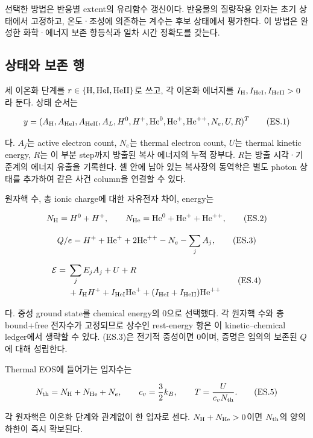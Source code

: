선택한 방법은 반응별 extent의 유리함수 갱신이다. 반응물의 질량작용 인자는 초기 상태에서 고정하고, 온도·조성에 의존하는 계수는 후보 상태에서 평가한다. 이 방법은 완성한 화학·에너지 보존 항등식과 일차 시간 정확도를 갖는다.

\hypertarget{uxc0c1uxd0dcuxc640-uxbcf4uxc874-uxd589}{%
\subsection{상태와 보존 행}\label{uxc0c1uxd0dcuxc640-uxbcf4uxc874-uxd589}}

세 이온화 단계를 \(r\in\{{\rm H},{\rm HeI},{\rm HeII}\}\)로 쓰고, 각 이온화 에너지를 \(I_{\rm H},I_{\rm HeI},I_{\rm HeII}>0\)라 둔다. 상태 순서는

\[
y=(A_{\rm H},A_{\rm HeI},A_{\rm HeII},A_L,
H^0,H^+,{\rm He}^0,{\rm He}^+,{\rm He}^{++},
N_e,U,R)^T
\tag{ES.1}
\]

다. \(A_j\)는 active electron count, \(N_e\)는 thermal electron count, \(U\)는 thermal kinetic energy, \(R\)는 이 부분 step까지 방출된 복사 에너지의 누적 장부다. \(R\)는 방출 시각·기준계의 에너지 유출을 기록한다. 셀 안에 남아 있는 복사장의 동역학은 별도 photon 상태를 추가하여 같은 사건 column을 연결할 수 있다.

원자핵 수, 총 ionic charge에 대한 자유전자 차이, energy는

\[
N_{\rm H}=H^0+H^+,\qquad
N_{\rm He}={\rm He}^0+{\rm He}^++{\rm He}^{++},
\tag{ES.2}
\]

\[
Q/e=H^++{\rm He}^++2{\rm He}^{++}-N_e-\sum_jA_j,
\tag{ES.3}
\]

\[
\begin{aligned}
{\cal E}
={}&\sum_j E_j A_j+U+R\\
 &+I_{\rm H}H^+
 +I_{\rm HeI}{\rm He}^+
 +(I_{\rm HeI}+I_{\rm HeII}){\rm He}^{++}
\end{aligned}
\tag{ES.4}
\]

다. 중성 ground state를 chemical energy의 0으로 선택했다. 각 원자핵 수와 총 bound+free 전자수가 고정되므로 상수인 rest-energy 항은 이 kinetic--chemical ledger에서 생략할 수 있다. (ES.3)은 전기적 중성이면 0이며, 증명은 임의의 보존된 \(Q\)에 대해 성립한다.

Thermal EOS에 들어가는 입자수는

\[
N_{\rm th}=N_{\rm H}+N_{\rm He}+N_e,\qquad
c_v=\frac32 k_B,\qquad T=\frac{U}{c_vN_{\rm th}}.
\tag{ES.5}
\]

각 원자핵은 이온화 단계와 관계없이 한 입자로 센다. \(N_{\rm H}+N_{\rm He}>0\)이면 \(N_{\rm th}\)의 양의 하한이 즉시 확보된다.

